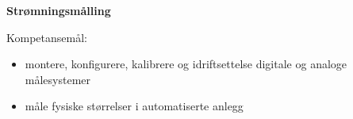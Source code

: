 \centerline{\bf Strømningsmålling}  \bigskip

Kompetansemål:
\begin{itemize}[noitemsep]

	\item montere, konfigurere, kalibrere og idriftsettelse digitale og analoge målesystemer
	\item måle fysiske størrelser i automatiserte anlegg
\end{itemize}
\vskip 2cm
